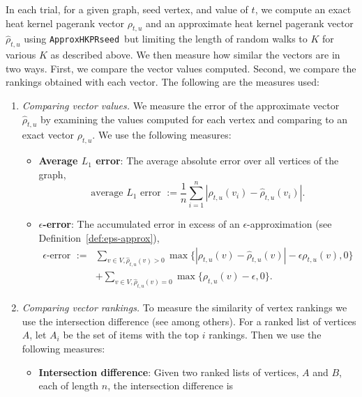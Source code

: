 \documentclass[runningheads,a4paper]{llncs}
\newcommand{\hkprseedalg}{\texttt{ApproxHKPRseed}}
\begin{document}
In each trial, for a given graph, seed vertex, and value of $t$, we compute an
exact heat kernel pagerank vector $\rho_{t,u}$ and an approximate heat kernel
pagerank vector $\hat{\rho}_{t,u}$ using \hkprseedalg~but limiting the length of
random walks to $K$ for various $K$ as described above.  We then measure how
similar the vectors are in two ways.  First, we compare the vector values
computed.  Second, we compare the rankings obtained with each vector.  The
following are the measures used:

\begin{enumerate}
\item \emph{Comparing vector values.}  We measure the error of the approximate
vector $\hat{\rho}_{t,u}$ by examining the values computed for each vertex and
comparing to an exact vector $\rho_{t,u}$.  We use the following measures:
  \begin{itemize}
  \item \textbf{Average $L_1$ error}: The average absolute error over all vertices of the graph,
  \begin{equation}\label{eq:measure-l1err}
  \mbox{average $L_1$ error } := \frac{1}{n}\sum_{i=1}^n
|\rho_{t,u}(v_i)-\hat{\rho}_{t,u}(v_i)|.
  \end{equation}
  \item \textbf{$\epsilon$-error}: The accumulated error in excess of an
$\epsilon$-approximation (see Definition~\ref{def:eps-approx}),
  \begin{align}
  \mbox{$\epsilon$-error } := &\sum_{v\in V, \hat{\rho}_{t,u}(v) > 0} \max\{|\rho_{t,u}(v) - \hat{\rho}_{t,u}(v)|
- \epsilon\rho_{t,u}(v), 0\}\nonumber\\
  &+ \sum_{v\in V, \hat{\rho}_{t,u}(v) = 0} \max\{\rho_{t,u}(v) - \epsilon,
0\}.\label{eq:measure-epserr} \end{align}
  \end{itemize}
\item \emph{Comparing vector rankings.}  To measure the similarity of vertex
rankings we use the intersection difference (see
\cite{benzi2013total,fagin2003comparing} among others).  For a ranked list of
vertices $A$, let $A_i$ be the set of items with the top $i$ rankings.  Then we
use the following measures:
  \begin{itemize}
  \item \textbf{Intersection difference}: Given two ranked lists of vertices,
$A$ and $B$, each of length $n$, the intersection difference is
  \begin{equation}\label{eq:measure-isim}

\end{equation}
\end{itemize}
\end{enumerate}
\end{document}

